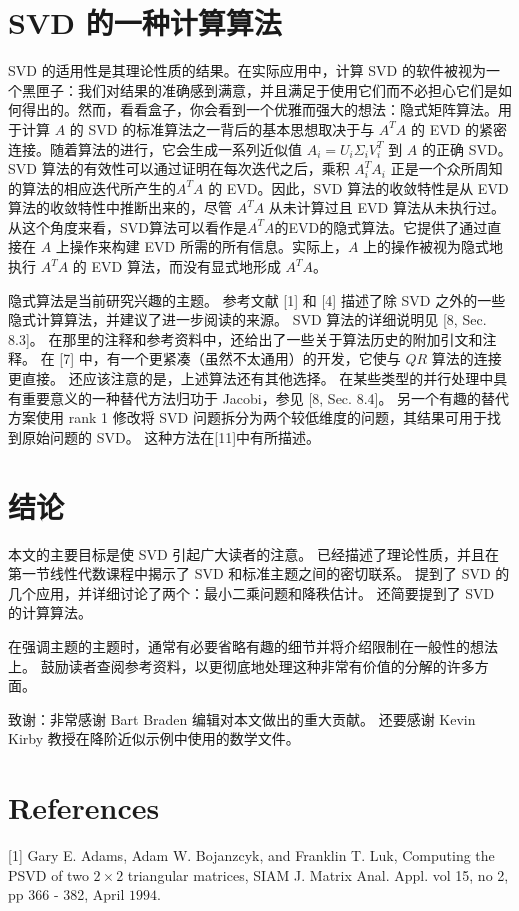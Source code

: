 \documentclass[11pt,a4paper,twoside]{article}
\begin{document}
\begin{CJK}{UTF8}{gbsn}
\section{SVD 的一种计算算法}
SVD 的适用性是其理论性质的结果。在实际应用中，计算 SVD 的软件被视为一个黑匣子：我们对结果的准确感到满意，并且满足于使用它们而不必担心它们是如何得出的。然而，看看盒子，你会看到一个优雅而强大的想法：隐式矩阵算法。用于计算 $A$ 的 SVD 的标准算法之一背后的基本思想取决于与 $A^{T} A$ 的 EVD 的紧密连接。随着算法的进行，它会生成一系列近似值 $A_{i}=U_{i} \Sigma_{i} V_{i}^{T}$ 到 $A$ 的正确 SVD。 SVD 算法的有效性可以通过证明在每次迭代之后，乘积 $A_{i}^{T} A_{i}$ 正是一个众所周知的算法的相应迭代所产生的$A^{T} A$ 的 EVD。因此，SVD 算法的收敛特性是从 EVD 算法的收敛特性中推断出来的，尽管 $A^{T} A$ 从未计算过且 EVD 算法从未执行过。从这个角度来看，SVD算法可以看作是$A^{T}A$的EVD的隐式算法。它提供了通过直接在 $A$ 上操作来构建 EVD 所需的所有信息。实际上，$A$ 上的操作被视为隐式地执行 $A^{T} A$ 的 EVD 算法，而没有显式地形成 $A^{T} A$。

隐式算法是当前研究兴趣的主题。 参考文献 [1] 和 [4] 描述了除 SVD 之外的一些隐式计算算法，并建议了进一步阅读的来源。 SVD 算法的详细说明见 [8, Sec. 8.3]。 在那里的注释和参考资料中，还给出了一些关于算法历史的附加引文和注释。 在 [7] 中，有一个更紧凑（虽然不太通用）的开发，它使与 $Q R$ 算法的连接更直接。 还应该注意的是，上述算法还有其他选择。 在某些类型的并行处理中具有重要意义的一种替代方法归功于 Jacobi，参见 [8, Sec. 8.4]。 另一个有趣的替代方案使用 rank 1 修改将 SVD 问题拆分为两个较低维度的问题，其结果可用于找到原始问题的 SVD。 这种方法在[11]中有所描述。

\section{结论}
本文的主要目标是使 SVD 引起广大读者的注意。 已经描述了理论性质，并且在第一节线性代数课程中揭示了 SVD 和标准主题之间的密切联系。 提到了 SVD 的几个应用，并详细讨论了两个：最小二乘问题和降秩估计。 还简要提到了 SVD 的计算算法。

在强调主题的主题时，通常有必要省略有趣的细节并将介绍限制在一般性的想法上。 鼓励读者查阅参考资料，以更彻底地处理这种非常有价值的分解的许多方面。

致谢：非常感谢 Bart Braden 编辑对本文做出的重大贡献。 还要感谢 Kevin Kirby 教授在降阶近似示例中使用的数学文件。

\section{References}
[1] Gary E. Adams, Adam W. Bojanzcyk, and Franklin T. Luk, Computing the PSVD of two $2 \times 2$ triangular matrices, SIAM J. Matrix Anal. Appl. vol 15, no 2, pp 366 - 382, April $1994 .$


\end{CJK}
\end{document}
